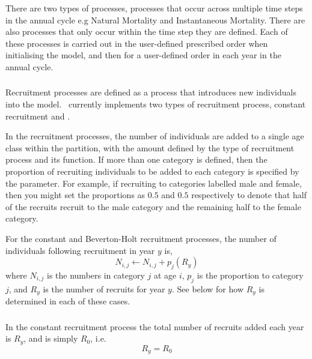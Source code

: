 There are two types of processes, processes that occur across multiple time steps in the annual cycle e.g Natural Mortality and Instantaneous Mortality. There are also processes that only occur within the time step they are defined. Each of these processes is carried out in the user-defined prescribed order when initialising the model, and then for a user-defined order in each year in the annual cycle. 

\subsubsection{}

Recruitment processes are defined as a process that introduces new individuals into the model. \CNAME\ currently implements two types of recruitment process, constant recruitment and   \citep{1203}.

In the recruitment processes, the number of individuals are added to a single age class within the partition, with the amount defined by the type of recruitment process and its function. If more than one category is defined, then the proportion of recruiting individuals to be added to each category is specified by the  parameter. For example, if recruiting to categories labelled male and female, then you might set the proportions as $0.5$ and $0.5$ respectively to denote that half of the recruits recruit to the male category and the remaining half to the female category.

For the constant and Beverton-Holt recruitment processes, the  number of individuals following recruitment in year $y$ is,  
\begin{equation}
N_{i,j} \leftarrow N_{i,j} + p_j(R_y)
\end{equation}
where $N_{i,j}$ is the numbers in category $j$ at age $i$, $p_j$ is the proportion to category $j$, and $R_y$ is the number of recruits for year $y$. See below for how $R_y$ is determined in each of these cases.

\subsubsection*{}

In the constant recruitment process the total number of recruits added each year is $R_y$, and is simply $R_0$, i.e.
\begin{equation}
  R_y = R_0
\end{equation}

